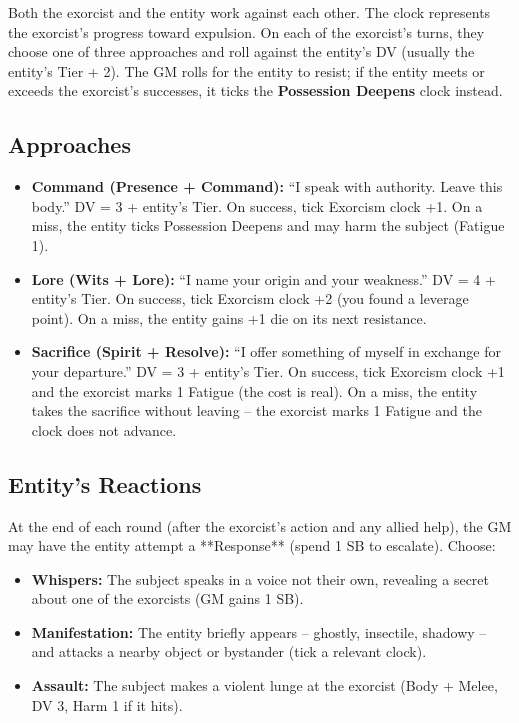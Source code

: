 \documentclass[10pt,a5paper]{book}
\begin{document}
Both the exorcist and the entity work against each other. The clock represents the exorcist’s progress toward expulsion. On each of the exorcist’s turns, they choose one of three approaches and roll against the entity’s DV (usually the entity’s Tier + 2). The GM rolls for the entity to resist; if the entity meets or exceeds the exorcist’s successes, it ticks the \textbf{Possession Deepens} clock instead.

\subsection*{Approaches}

\begin{itemize}
    \item \textbf{Command (Presence + Command):} “I speak with authority. Leave this body.” DV = 3 + entity’s Tier. On success, tick Exorcism clock +1. On a miss, the entity ticks Possession Deepens and may harm the subject (Fatigue 1).
    \item \textbf{Lore (Wits + Lore):} “I name your origin and your weakness.” DV = 4 + entity’s Tier. On success, tick Exorcism clock +2 (you found a leverage point). On a miss, the entity gains +1 die on its next resistance.
    \item \textbf{Sacrifice (Spirit + Resolve):} “I offer something of myself in exchange for your departure.” DV = 3 + entity’s Tier. On success, tick Exorcism clock +1 and the exorcist marks 1 Fatigue (the cost is real). On a miss, the entity takes the sacrifice without leaving – the exorcist marks 1 Fatigue and the clock does not advance.
\end{itemize}

\subsection*{Entity’s Reactions}

At the end of each round (after the exorcist’s action and any allied help), the GM may have the entity attempt a **Response** (spend 1 SB to escalate). Choose:
\begin{itemize}
    \item \textbf{Whispers:} The subject speaks in a voice not their own, revealing a secret about one of the exorcists (GM gains 1 SB).
    \item \textbf{Manifestation:} The entity briefly appears – ghostly, insectile, shadowy – and attacks a nearby object or bystander (tick a relevant clock).
    \item \textbf{Assault:} The subject makes a violent lunge at the exorcist (Body + Melee, DV 3, Harm 1 if it hits).
\end{itemize}
\end{document}
